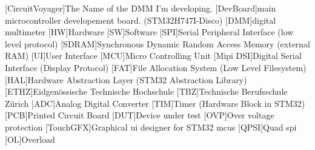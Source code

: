 \begin{acronym}
        [CircuitVoyager]{The Name of the DMM I'm developing.}
        [DevBoard]{main microcontroller developement board. (STM32H747I-Disco)}
        [DMM]{digital multimeter}
        [HW]{Hardware}
        [SW]{Software}
        [SPI]{Serial Peripheral Interface (low level protocol)}
        [SDRAM]{Synchronous Dynamic Random Access Memory (external RAM)}
        [UI]{User Interface}
        [MCU]{Micro Controlling Unit}
        [Mipi DSI]{Digital Serial Interface (Display Protocol)}
        [FAT]{File Allocation System (Low Level Filesystem)}
        [HAL]{Hardware Abstraction Layer (STM32 Abstraction Library)}
        [ETHZ]{Eidgenössische Technische Hochschule}
        [TBZ]{Technische Berufsschule Zürich}
        [ADC]{Analog Digital Converter}
        [TIM]{Timer (Hardware Block in STM32)}
        [PCB]{Printed Circuit Board}
        [DUT]{Device under test}
        [OVP]{Over voltage protection}
        [TouchGFX]{Graphical \acs{ui} designer for STM32 \acs{mcu}s}
        [QPSI]{Quad \acs{spi}}
        [OL]{Overload}
\end{acronym}